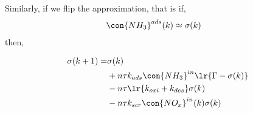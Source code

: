 Similarly, if we flip the approximation, that is if,
\begin{align*}
    \con{NH_3}^{ads}(k) &\approx \sigma(k)
\end{align*}
then,

\begin{align*}
    \sigma(k + 1) =& \sigma(k)\\
        &+ n\tau k_{ads} \con{NH_3}^{in} \lr{\Gamma - \sigma(k)} \\
        &- n \tau \lr{k_{oxi} + k_{des}} \sigma(k)\\
        &- n \tau k_{scr} \con{NO_x}^{in}(k) \sigma(k)
\end{align*}
